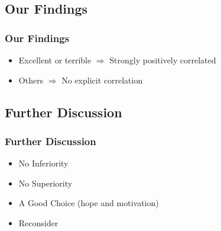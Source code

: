 \subsection{Our Findings}
\begin{frame}
    \frametitle{Our Findings}
    \LARGE
    \begin{itemize}
        \item Excellent or terrible $\Rightarrow$ Strongly positively correlated \label{itm:Findings}
        \item Others $\Rightarrow$ No explicit correlation
    \end{itemize}
\end{frame}



\subsection{Further Discussion}
\begin{frame}
    \frametitle{Further Discussion}
    \LARGE
    \begin{itemize}[<+->]
        \item No Inferiority
        \item No Superiority
        \item A Good Choice (hope and motivation)
        \item Reconsider
    \end{itemize}
\end{frame}